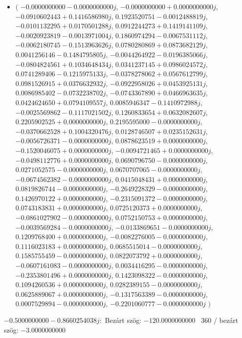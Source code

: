 \documentclass[14pt,a4paper]{article}
\begin{document}
\begin{itemize}
\item
$\big($
$-0.0000000000-0.0000000000j$, $-0.0000000000+0.0000000000j$, $-0.0910602443+0.1416586980j$, $0.1923520751-0.0012488819j$, $-0.0101132295+0.0170501288j$, $0.0912244273+0.1419141109j$, $-0.0020923819-0.0013971004j$, $0.1860974294-0.0067531112j$, $-0.0062180745-0.1513963626j$, $0.0780280869+0.0873682129j$, $0.0041256146-0.1484795805j$, $-0.0044264922-0.0196385066j$, $-0.0804824561+0.1034648434j$, $0.0341237145+0.0986024572j$, $0.0741289406-0.1215975133j$, $-0.0378278062+0.0567612799j$, $0.0981526915+0.0376632932j$, $-0.0922958026+0.0453925131j$, $0.0086985402-0.0732238702j$, $-0.0743367890+0.0466963635j$, $0.0424624650+0.0794109557j$, $0.0085946347-0.1410972988j$, $-0.0025569862-0.1117021502j$, $0.1260833654+0.0632082607j$, $0.2205902525+0.0000000000j$, $0.2195595000-0.0000000000j$, $-0.0370662528+0.1004320476j$, $0.0128746507+0.0235152631j$, $-0.0056726371-0.0000000000j$, $0.0878623519+0.0000000000j$, $-0.1520046075+0.0000000000j$, $-0.0094721465+0.0000000000j$, $-0.0498112776+0.0000000000j$, $0.0690796750-0.0000000000j$, $0.0271052575-0.0000000000j$, $0.0670707065-0.0000000000j$, $-0.0674562382-0.0000000000j$, $0.0415048431+0.0000000000j$, $0.0819826744-0.0000000000j$, $-0.2649228329-0.0000000000j$, $0.1426970122+0.0000000000j$, $-0.2315091372-0.0000000000j$, $0.0743183831+0.0000000000j$, $0.0725120373+0.0000000000j$, $-0.0861027902-0.0000000000j$, $0.0752150753+0.0000000000j$, $-0.0039569284-0.0000000000j$, $-0.0133869651-0.0000000000j$, $0.1209768400+0.0000000000j$, $-0.0082276005-0.0000000000j$, $0.1116023183+0.0000000000j$, $0.0685515014-0.0000000000j$, $0.1585755459-0.0000000000j$, $0.0822073792+0.0000000000j$, $-0.0607161083-0.0000000000j$, $0.0034416295-0.0000000000j$, $-0.2353801496+0.0000000000j$, $0.1423098322-0.0000000000j$, $0.1094260536+0.0000000000j$, $0.0282389155-0.0000000000j$, $0.0625889067+0.0000000000j$, $-0.1317563389-0.0000000000j$, $0.0007529894-0.0000000000j$, $-0.2201060777-0.0000000000j$
$\big)$
\end{itemize}
$-0.5000000000-0.8660254038j$:\
Bezárt szög: $-120.0000000000$ \
360 / bezárt szög: $-3.0000000000$\
\end{document}
